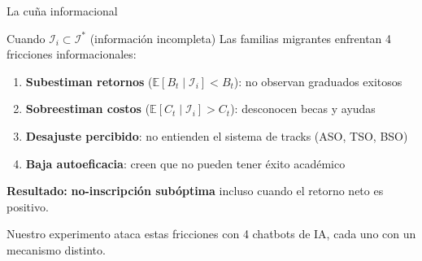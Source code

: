 \documentclass[aspectratio=169, 11pt]{beamer}
\begin{document}
\begin{frame}{La cuña informacional}
\begin{alertblock}{Cuando $\mathcal{I}_i \subset \mathcal{I}^*$ (información incompleta)}
\small
Las familias migrantes enfrentan 4 fricciones informacionales:
\begin{enumerate}\setlength{\itemsep}{3pt}
  \item \textbf{Subestiman retornos} ($\mathbb{E}[B_t \mid \mathcal{I}_i] < B_t$): no observan graduados exitosos
  \item \textbf{Sobreestiman costos} ($\mathbb{E}[C_t \mid \mathcal{I}_i] > C_t$): desconocen becas y ayudas
  \item \textbf{Desajuste percibido}: no entienden el sistema de tracks (ASO, TSO, BSO)
  \item \textbf{Baja autoeficacia}: creen que no pueden tener éxito académico
\end{enumerate}
\end{alertblock}

\vspace{0.3cm}
\textbf{Resultado:} \textbf{no-inscripción subóptima} incluso cuando el retorno neto es positivo.

\vspace{0.2cm}
{\small Nuestro experimento ataca estas fricciones con 4 chatbots de IA, cada uno con un mecanismo distinto.}
\end{frame}
\end{document}
